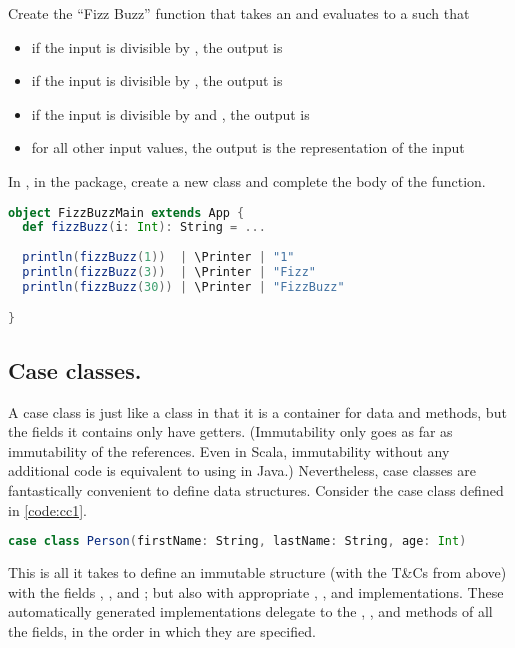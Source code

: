 \documentclass[10 pt]{article}
\begin{document}
\begin{example}
Create the ``Fizz Buzz'' function that takes an  and evaluates to a  such that 
\begin{itemize}
  \item if the input is divisible by , the output is 
  \item if the input is divisible by , the output is 
  \item if the input is divisible by  and , the output is 
  \item for all other input values, the output is the  representation of the input
\end{itemize}

In , in the  package, create a new class  and complete the body of the  function.

\begin{lstlisting}[caption={Fizz Buzz}, label={code:fb}, language=Scala, escapechar=|]
object FizzBuzzMain extends App {
  def fizzBuzz(i: Int): String = ...
  
  println(fizzBuzz(1))  | \Printer | "1"
  println(fizzBuzz(3))  | \Printer | "Fizz"
  println(fizzBuzz(30)) | \Printer | "FizzBuzz"

}
\end{lstlisting}
\end{example}

\subsection{Case classes.} A case class is just like a class in that it is a container for data and methods, but the fields it contains only have getters. (Immutability only goes as far as immutability of the references. Even in Scala, immutability without any additional code is equivalent to using  in Java.) Nevertheless, case classes are fantastically convenient to define data structures. Consider the  case class defined in \autoref{code:cc1}.

\begin{lstlisting}[caption={Case class \pcode{Person}}, label={code:cc1}, language=Scala, escapechar=|]
case class Person(firstName: String, lastName: String, age: Int)
\end{lstlisting}

This is all it takes to define an immutable structure (with the T\&Cs from above) with the fields , , and ; but also with appropriate , , and  implementations. These automatically generated implementations delegate to the , , and  methods of all the fields, in the order in which they are specified.
\end{document}
